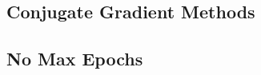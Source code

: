 \begin{appendices}


         \section{Conjugate Gradient Methods} %
         \label{sec:conjugate_gradient_methods}
            \subsection{No Max Epochs} %
            \label{sub:comparisons}


\end{appendices}
